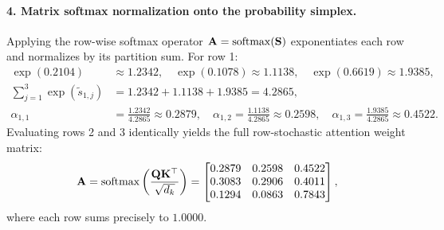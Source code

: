 \documentclass[../../main.tex]{subfiles}
\begin{document}
\paragraph{4. Matrix softmax normalization onto the probability simplex.}
Applying the row-wise softmax operator $\mathbf{A} = \operatorname{\mathrm{softmax}}(\mathbf{S})$ exponentiates each row and normalizes by its partition sum.
For row 1:
\begin{align}
\exp(0.2104) &\approx 1.2342, \quad \exp(0.1078) \approx 1.1138, \quad \exp(0.6619) \approx 1.9385, \\
\sum_{j=1}^3 \exp(\tilde{s}_{1,j}) &= 1.2342 + 1.1138 + 1.9385 = 4.2865, \\
\alpha_{1,1} &= \frac{1.2342}{4.2865} \approx 0.2879, \quad \alpha_{1,2} = \frac{1.1138}{4.2865} \approx 0.2598, \quad \alpha_{1,3} = \frac{1.9385}{4.2865} \approx 0.4522.
\end{align}
Evaluating rows 2 and 3 identically yields the full row-stochastic attention weight matrix:
\begin{equation}
\label{eq:matrix_attention_weights_numerical}
\mathbf{A} = \operatorname{\mathrm{softmax}}\left(\frac{\mathbf{Q} \mathbf{K}^\top}{\sqrt{d_k}}\right) = \begin{bmatrix}
0.2879 & 0.2598 & 0.4522 \\
0.3083 & 0.2906 & 0.4011 \\
0.1294 & 0.0863 & 0.7843
\end{bmatrix},
\end{equation}
where each row sums precisely to $1.0000$.
\end{document}

